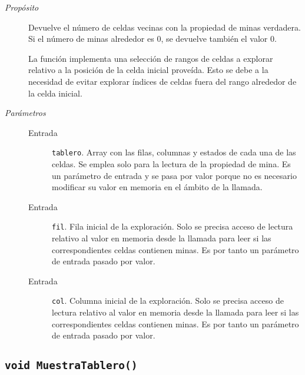 \documentclass[12pt]{article}
\begin{document}
\begin{description}

\item[\emph{Propósito}]

Devuelve el número de celdas vecinas con la propiedad de minas verdadera. Si el
número de minas alrededor es 0, se devuelve también el valor 0.

La función implementa una selección de rangos de celdas a explorar relativo a la
posición de la celda inicial proveída. Esto se debe a la necesidad de evitar
explorar índices de celdas fuera del rango alrededor de la celda inicial.

\item[\emph{Parámetros}] \leavevmode

\begin{description}

\item[Entrada] \texttt{tablero}. Array con las filas, columnas y
estados de cada una de las celdas. Se emplea solo para la lectura de la
propiedad de mina. Es un parámetro de entrada y se pasa por valor porque no es
necesario modificar su valor en memoria en el ámbito de la llamada.

\item[Entrada] \texttt{fil}. Fila inicial de la exploración. Solo se
precisa acceso de lectura relativo al valor en memoria desde la llamada para
leer si las correspondientes celdas contienen minas. Es por tanto un parámetro
de entrada pasado por valor.

\item[Entrada] \texttt{col}. Columna inicial de la exploración. Solo se
precisa acceso de lectura relativo al valor en memoria desde la llamada para
leer si las correspondientes celdas contienen minas. Es por tanto un parámetro
de entrada pasado por valor.

\end{description}

\end{description}

\subsection*{\texttt{void MuestraTablero()}}
\end{document}

